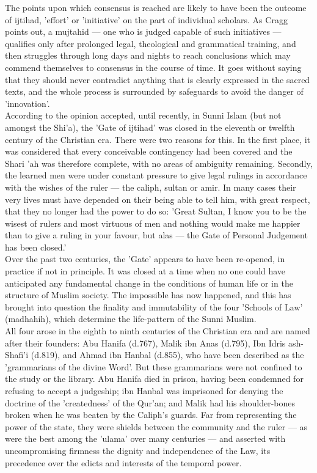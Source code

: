 \documentclass[11pt, b5paper, twoside]{book}
\begin{document}
The points upon which consensus is reached are likely to have been the outcome of ijtihad, 'effort' 
or 'initiative' on the part of individual scholars. As Cragg points out, a mujtahid --- one who is 
judged capable of such initiatives --- qualifies only after prolonged legal, theological and 
grammatical training, and then struggles through long days and nights to reach conclusions which may 
commend themselves to consensus in the course of time. It goes without saying that they should never 
contradict anything that is clearly expressed in the sacred texts, and the whole process is 
surrounded by safeguards to avoid the danger of 'innovation'. \\

According to the opinion accepted, until recently, in Sunni Islam (but not amongst the Shi'a), the 
'Gate of ijtihad' was closed in the eleventh or twelfth century of the Christian era. There were two 
reasons for this. In the first place, it was considered that every conceivable contingency had been 
covered and the Shari 'ah was therefore complete, with no areas of ambiguity remaining. Secondly, the 
learned men were under constant pressure to give legal rulings in accordance with the wishes of the 
ruler --- the caliph, sultan or amir. In many cases their very lives must have depended on their being 
able to tell him, with great respect, that they no longer had the power to do so: 'Great Sultan, I 
know you to be the wisest of rulers and most virtuous of men and nothing would make me happier than 
to give a ruling in your favour, but alas --- the Gate of Personal Judgement has been closed.' \\

Over the past two centuries, the 'Gate' appears to have been re-opened, in practice if not in 
principle. It was closed at a time when no one could have anticipated any fundamental change in the 
conditions of human life or in the structure of Muslim society. The impossible has now happened, and 
this has brought into question the finality and immutability of the four 'Schools of Law' (madhahih), 
which determine the life-pattern of the Sunni Muslim. \\

All four arose in the eighth to ninth centuries of the Christian era and are named after their 
founders: Abu Hanifa (d.767), Malik ibn Anas (d.795), Ibn Idris ash-Shafi'i (d.819), and Ahmad ibn 
Hanbal (d.855), who have been described as the 'grammarians of the divine Word'. But these 
grammarians were not confined to the study or the library. Abu Hanifa died in prison, having been 
condemned for refusing to accept a judgeship; ibn Hanbal was imprisoned for denying the doctrine of 
the 'createdness' of the Qur'an; and Malik had his shoulder-bones broken when he was beaten by the 
Caliph's guards. Far from representing the power of the state, they were shields between the 
community and the ruler --- as were the best among the 'ulama' over many centuries --- and asserted with 
uncompromising firmness the dignity and independence of the Law, its precedence over the edicts and 
interests of the temporal power. \\
\end{document}
